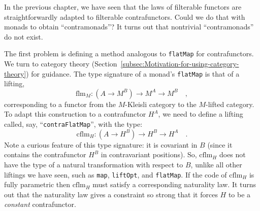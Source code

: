 In the previous chapter, we have seen that the laws of filterable
functors are straightforwardly adapted to filterable contrafunctors.
Could we do that with monads to obtain \textsf{``}contramonads\textsf{''}? It turns
out that nontrivial \textsf{``}contramonads\textsf{''} do not
exist. 

The first problem is defining a method analogous to \lstinline!flatMap!
for contrafunctors. We turn to category theory (Section~\ref{subsec:Motivation-for-using-category-theory})
for guidance. The type signature of a monad\textsf{'}s \lstinline!flatMap!
is that of a lifting,
\[
\text{flm}_{M}:(A\rightarrow M^{B})\rightarrow M^{A}\rightarrow M^{B}\quad,
\]
corresponding to a functor from the $M$-Kleisli category to the $M$-lifted
category. To adapt this construction to a contrafunctor $H^{A}$,
we need to define a lifting called, say, \textsf{``}\lstinline!contraFlatMap!\textsf{''},
with the type:
\[
\text{cflm}_{H}:(A\rightarrow H^{B})\rightarrow H^{B}\rightarrow H^{A}\quad.
\]
Note a curious feature of this type signature: it is covariant in
$B$ (since it contains the contrafunctor $H^{B}$ in contravariant
positions). So, $\text{cflm}_{H}$ does not have the type of a natural
transformation with respect to $B$, unlike all other liftings we
have seen, such as \lstinline!map!, \lstinline!liftOpt!, and \lstinline!flatMap!.
If the code of $\text{cflm}_{H}$ is fully parametric then $\text{cflm}_{H}$
must satisfy a corresponding naturality law. It turns out that the
naturality law gives a constraint so strong that it forces $H$ to
be a \emph{constant} contrafunctor.

